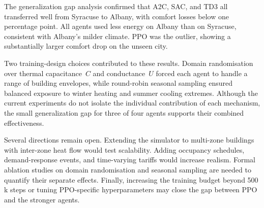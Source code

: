 \documentclass[conference]{IEEEtran}
\begin{document}
The generalization gap analysis confirmed that A2C, SAC, and TD3 all
transferred well from Syracuse to Albany, with comfort losses below one
percentage point. All agents used less energy on Albany than on Syracuse,
consistent with Albany's milder climate. PPO was the outlier, showing a
substantially larger comfort drop on the unseen city.

Two training-design choices contributed to these results. Domain
randomisation over thermal capacitance~$C$ and conductance~$U$ forced each
agent to handle a range of building envelopes, while round-robin seasonal
sampling ensured balanced exposure to winter heating and summer cooling
extremes. Although the current experiments do not isolate the individual
contribution of each mechanism, the small generalization gap for three of
four agents supports their combined effectiveness.

Several directions remain open. Extending the simulator to multi-zone
buildings with inter-zone heat flow would test scalability. Adding
occupancy schedules, demand-response events, and time-varying tariffs would
increase realism. Formal ablation studies on domain randomisation and
seasonal sampling are needed to quantify their separate effects. Finally,
increasing the training budget beyond 500\,k steps or tuning
PPO-specific hyperparameters may close the gap between PPO and the
stronger agents.



\end{document}
